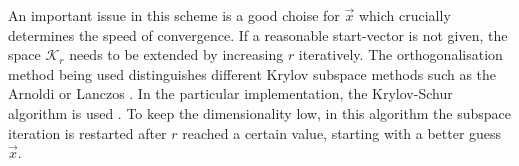 An important issue in this scheme is a good choise for $\vec{x}$ which crucially determines the speed of convergence.
If a reasonable start-vector is not given, the space $\mathcal{K}_r$ needs to be extended by increasing $r$ iteratively.
The orthogonalisation method being used distinguishes different Krylov subspace methods such as the Arnoldi \cite{str-4} or Lanczos \cite{str-5}.
In the particular implementation, the Krylov-Schur algorithm is used \cite{str-7,KrSch}.
To keep the dimensionality low, in this algorithm the subspace iteration is restarted after $r$ reached a certain value, starting with a better guess $\vec{x}$.

%
%

